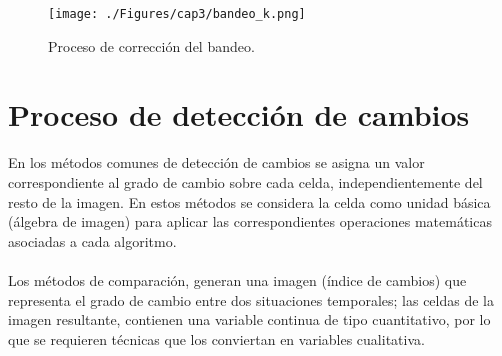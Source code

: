     \begin{figure}[H]
    	\centering
    	\texttt{[image: ./Figures/cap3/bandeo\_k.png]}
    	\caption{Proceso de correcci\'on del bandeo.}
    	\label{fig:bandeado}
    \end{figure}

\section{Proceso de detecci\'on de cambios}
En los m\'etodos comunes de detecci\'on de cambios se asigna un valor correspondiente al grado de cambio sobre cada celda, independientemente del resto de la imagen. En estos m\'etodos se considera la celda como unidad b\'asica (\'algebra de imagen) para aplicar las correspondientes operaciones matem\'aticas asociadas a cada algoritmo.\\~\\
Los m\'etodos de comparaci\'on, generan una imagen (\'indice de cambios) que representa el grado de cambio entre dos situaciones temporales; las celdas de la imagen resultante, contienen una variable continua de tipo cuantitativo, por lo que se requieren t\'ecnicas que los conviertan en variables cualitativa\cite{martinez2013normalizacion}.

